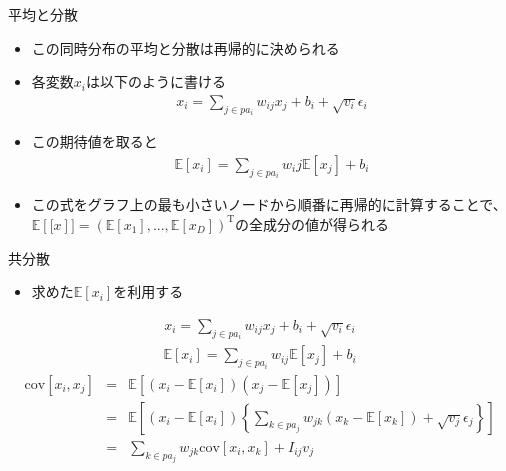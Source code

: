 \begin{frame}{平均と分散}
 \begin{itemize}
  \item この同時分布の平均と分散は再帰的に決められる
  \item 各変数$x_i$は以下のように書ける
        \begin{eqnarray*}
         x_i = \sum_{j \in pa_i}w_{ij}x_j + b_i + \sqrt{v_i}\epsilon_i
        \end{eqnarray*}
  \item この期待値を取ると
        \begin{eqnarray*}
         \mathbb{E}[x_i] = \sum_{j \in pa_i}w_ij\mathbb{E}[x_j]+b_i
        \end{eqnarray*}
  \item この式をグラフ上の最も小さいノードから順番に再帰的に計算することで、$\mathbb{E}[\mathrm[x]]=(\mathbb{E}[x_1], ... , \mathbb{E}[x_D])^{\mathrm{T}}$の全成分の値が得られる
 \end{itemize}
\end{frame}

\begin{frame}{共分散}
 \begin{itemize}
  \item 求めた$\mathbb{E}[x_i]$を利用する
 \end{itemize}
 \begin{eqnarray*}
  x_i = \sum_{j \in pa_i}w_{ij}x_j + b_i + \sqrt{v_i}\epsilon_i
 \end{eqnarray*}
 \begin{eqnarray*}
  \mathbb{E}[x_i] = \sum_{j \in pa_i}w_{ij}\mathbb{E}[x_j]+b_i
 \end{eqnarray*}
 \begin{eqnarray*}
  \mathrm{cov}[x_i, x_j] &=& \mathbb{E}[(x_i-\mathbb{E}[x_i])(x_j-\mathbb{E}[x_j])]\\
  &= & \mathbb{E}\left[(x_i-\mathbb{E}[x_i])\left\{\sum_{k \in pa_j}w_{jk}(x_k-\mathbb{E}[x_k])+\sqrt{v_j}\epsilon_j \right\}\right]\\
  &= & \sum_{k \in pa_j}w_{jk}\mathrm{cov}[x_i,x_k]+I_{ij}v_j
 \end{eqnarray*}
\end{frame}

